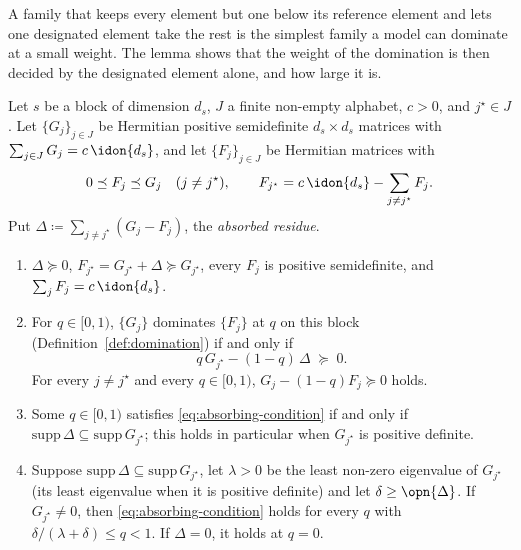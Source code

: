 
A family that keeps every element but one below its reference element and
lets one designated element take the rest is the simplest family a model can
dominate at a small weight. The lemma shows that the weight of the domination
is then decided by the designated element alone, and how large it is.

\begin{lemma}\label{lem:absorbing-domination}
Let $s$ be a block of dimension $d_s$, $J$ a finite non-empty alphabet,
$c>0$, and $j^{\star}\in J$. Let $\{G_j\}_{j\in J}$ be Hermitian positive
semidefinite $d_s\times d_s$ matrices with $\sum_{j\in J}G_j=c\,\idon{d_s}$,
and let $\{F_j\}_{j\in J}$ be Hermitian matrices with
\begin{equation}\label{eq:absorbing}
  0\preceq F_j\preceq G_j\quad(j\neq j^{\star}),
  \qquad
  F_{j^{\star}}=c\,\idon{d_s}-\sum_{j\neq j^{\star}}F_j .
\end{equation}
Put $\Delta\coloneqq\sum_{j\neq j^{\star}}(G_j-F_j)$, the \emph{absorbed
residue}.
\begin{enumerate}[label=(\roman*),leftmargin=2.4em]
\item $\Delta\succeq0$, $F_{j^{\star}}=G_{j^{\star}}+\Delta\succeq G_{j^{\star}}$,
  every $F_j$ is positive semidefinite, and $\sum_jF_j=c\,\idon{d_s}$.
\item For $q\in[0,1)$, $\{G_j\}$ dominates $\{F_j\}$ at $q$ on this block
  (Definition~\ref{def:domination}) if and only if
  \begin{equation}\label{eq:absorbing-condition}
    q\,G_{j^{\star}}-(1-q)\,\Delta\;\succeq\;0 .
  \end{equation}
  For every $j\neq j^{\star}$ and every $q\in[0,1)$,
  $G_j-(1-q)F_j\succeq0$ holds.
\item Some $q\in[0,1)$ satisfies \eqref{eq:absorbing-condition} if and only if
  $\mathrm{supp}\,\Delta\subseteq\mathrm{supp}\,G_{j^{\star}}$; this holds in
  particular when $G_{j^{\star}}$ is positive definite.
\item Suppose $\mathrm{supp}\,\Delta\subseteq\mathrm{supp}\,G_{j^{\star}}$,
  let $\lambda>0$ be the least non-zero eigenvalue of $G_{j^{\star}}$ (its
  least eigenvalue when it is positive definite) and let
  $\delta\ge\opn{\Delta}$. If $G_{j^{\star}}\neq0$, then
  \eqref{eq:absorbing-condition} holds for every $q$ with
  $\delta/(\lambda+\delta)\le q<1$. If $\Delta=0$, it holds at $q=0$.
\end{enumerate}
\end{lemma}

